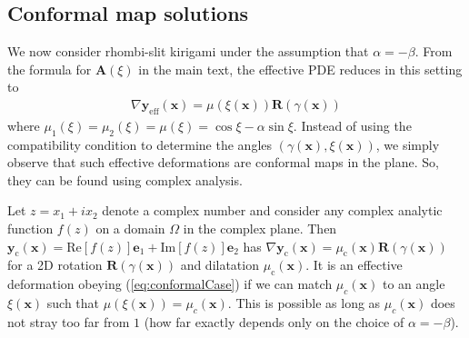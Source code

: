 \documentclass[aps,11pt,tightenlines,notitlepage,superscriptaddress,longbibliography,nofootinbib]{revtex4-1}
\begin{document}
\subsection{Conformal map solutions}
We now consider rhombi-slit kirigami under the assumption that $\alpha = - \beta$.  From the formula for $\mathbf{A}(\xi)$ in the main text, the effective PDE reduces in this setting to
\begin{equation}
    \begin{aligned}\label{eq:conformalCase}
        \nabla \mathbf{y}_{\text{eff}}(\mathbf{x}) = \mu(\xi(\mathbf{x}))  \mathbf{R}(\gamma(\mathbf{x})) 
    \end{aligned}
\end{equation}
where $\mu_1(\xi) = \mu_2(\xi) = \mu(\xi) = \cos \xi - \alpha \sin \xi$.
Instead of using the compatibility condition to determine the angles $(\gamma(\mathbf{x}), \xi(\mathbf{x}))$, we simply observe that such effective deformations are conformal maps in the plane. So, they can be found using complex analysis. 


Let $z = x_ 1 + i x_2$ denote a complex number and consider any complex analytic function  $f(z)$  on a domain $\Omega$ in the complex plane.  Then  $\mathbf{y}_{\text{c}}(\mathbf{x}) = \text{Re}[f(z)] \mathbf{e}_1 + \text{Im}[f(z)] \mathbf{e}_2$ has $\nabla \mathbf{y}_{\text{c}}(\mathbf{x}) = \mu_{\text{c}}(\mathbf{x}) \mathbf{R}(\gamma(\mathbf{x}))$ for a 2D rotation $\mathbf{R}(\gamma(\mathbf{x}))$ and dilatation $\mu_{\text{c}}(\mathbf{x})$. It is an effective deformation obeying (\ref{eq:conformalCase}) if we can match  $\mu_c(\mathbf{x})$ to an angle $\xi(\mathbf{x})$ such that $\mu(\xi(\mathbf{x})) = \mu_c(\mathbf{x})$.  This is  possible as long as $\mu_c(\mathbf{x})$  does not stray too far from $1$ (how far exactly depends only on the choice of $\alpha = -\beta$).
\end{document}
